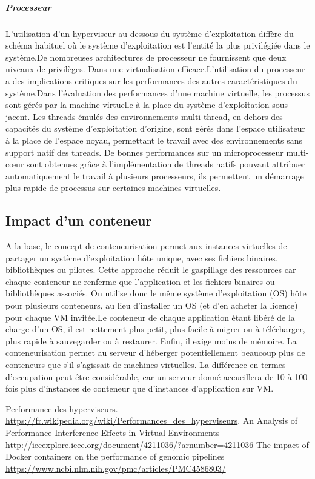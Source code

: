 \documentclass[french]{article}
\begin{document}
\subparagraph{Processeur}
L'utilisation d'un hyperviseur au-dessous du système d'exploitation diffère du schéma habituel où le système d'exploitation est l'entité la plus privilégiée dans le système.De nombreuses architectures de processeur ne fournissent que deux niveaux de privilèges. Dans une virtualisation efficace.L'utilisation du processeur a des implications critiques sur les performances des autres caractéristiques du système.Dans l'évaluation des performances d'une machine virtuelle, les processus sont gérés par la machine virtuelle à la place du système d'exploitation sous-jacent. Les threads émulés des environnements multi-thread, en dehors des capacités du système d'exploitation d'origine, sont gérés dans l'espace utilisateur à la place de l'espace noyau, permettant le travail avec des environnements sans support natif des threads. De bonnes performances sur un microprocesseur multi-cœur sont obtenues grâce à l'implémentation de threads natifs pouvant attribuer automatiquement le travail à plusieurs processeurs, ils permettent un démarrage plus rapide de processus sur certaines machines virtuelles.

\subsection{Impact d'un conteneur}
A la base, le concept de conteneurisation permet aux instances virtuelles de partager un système d'exploitation hôte unique, avec ses fichiers binaires, bibliothèques ou pilotes. 
Cette approche réduit le gaspillage des ressources car chaque conteneur ne renferme que l'application et les fichiers binaires ou bibliothèques associés. On utilise donc le même système d'exploitation (OS) hôte pour plusieurs conteneurs, au lieu d'installer un OS (et d'en acheter la licence) pour chaque VM invitée.Le conteneur de chaque application étant libéré de la charge d'un OS, il est nettement plus petit, plus facile à migrer ou à télécharger, plus rapide à sauvegarder ou à restaurer. Enfin, il exige moins de mémoire. La conteneurisation permet au serveur d'héberger potentiellement beaucoup plus de conteneurs que s'il s'agissait de machines virtuelles. La différence en termes d'occupation peut être considérable, car un serveur donné accueillera de 10 à 100 fois plus d'instances de conteneur que d'instances d'application sur VM.


\newpage
\begin{thebibliography}{9}

          Performance des hyperviseurs.
          \url{https://fr.wikipedia.org/wiki/Performances_des_hyperviseurs}.
          An Analysis of Performance Interference Effects in Virtual Environments
          \url{http://ieeexplore.ieee.org/document/4211036/?arnumber=4211036}
          The impact of Docker containers on the performance of genomic pipelines
          \url {https://www.ncbi.nlm.nih.gov/pmc/articles/PMC4586803/}
      
      
      
\end{thebibliography}
\end{document}
